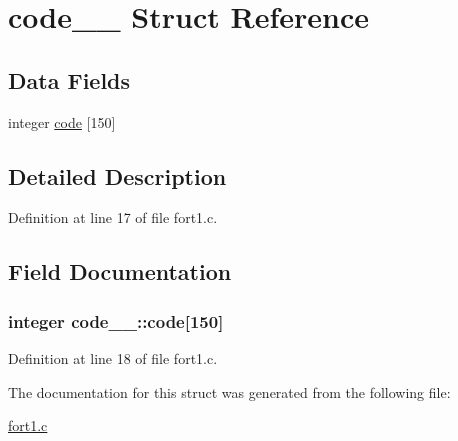 \hypertarget{structcode__1__}{}\section{code\+\_\+\_\+ Struct Reference}
\label{structcode__1__}
\subsection*{Data Fields}
\begin{DoxyCompactItemize}
\item 
integer \hyperlink{structcode__1___a8a95b35e67868ad7da3dd3171eba6b1a}{code} \mbox{[}150\mbox{]}
\end{DoxyCompactItemize}


\subsection{Detailed Description}


Definition at line 17 of file fort1.\+c.



\subsection{Field Documentation}
\subsubsection[{\texorpdfstring{code}{code}}]{\setlength{\rightskip}{0pt plus 5cm}integer code\+\_\+\_\+\+::code\mbox{[}150\mbox{]}}\hypertarget{structcode__1___a8a95b35e67868ad7da3dd3171eba6b1a}{}\label{structcode__1___a8a95b35e67868ad7da3dd3171eba6b1a}


Definition at line 18 of file fort1.\+c.



The documentation for this struct was generated from the following file\+:\begin{DoxyCompactItemize}
\item 
\hyperlink{fort1_8c}{fort1.\+c}\end{DoxyCompactItemize}
